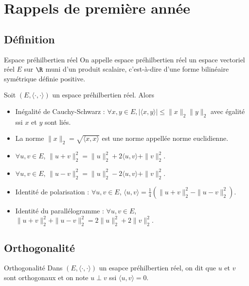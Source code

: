 \section{Rappels de première année}
\subsection{Définition}

\begin{definition}{Espace préhilbertien réel}{}
    On appelle espace préhilbertien réel un espace vectoriel réel $E$
    sur $\R$ muni d'un produit scalaire, c'est-à-dire d'une forme 
    bilinéaire symétrique définie positive.
\end{definition}

\begin{proposition}{}{}
    Soit $(E, \langle \cdot, \cdot \rangle)$ un espace préhilbertien réel. Alors
    \begin{itemize}
        \item Inégalité de Cauchy-Schwarz : $\forall x, y \in E, |\langle x, y \rangle| \leqslant \|x\|_2 \|y\|_2$ avec 
        égalité ssi $x$ et $y$ sont liés.
        \item La norme $\|x\|_2 = \sqrt{\langle x, x \rangle}$ est une norme appellée norme euclidienne.
        \item $\forall u, v \in E$, $\|u + v\|_2^2 = \|u\|_2^2 + 2\langle u, v \rangle + \|v\|_2^2$.
        \item $\forall u, v \in E$, $\|u - v\|_2^2 = \|u\|_2^2 - 2\langle u, v \rangle + \|v\|_2^2$.
        \item Identité de polarisation : $\forall u, v \in E$, $\langle u, v \rangle = \frac{1}{4}(\|u + v\|_2^2 - \|u - v\|_2^2)$.
        \item Identité du parallélogramme : $\forall u, v \in E$, $\|u + v\|_2^2 + \|u - v\|_2^2 = 2\|u\|_2^2 + 2\|v\|_2^2$.
    \end{itemize}
\end{proposition}

\subsection{Orthogonalité}

\begin{definition}{Orthogonalité}{}
    Dans $(E, \langle \cdot, \cdot \rangle)$ un esapce préhilbertien réel, on dit que 
    $u$ et $v$ sont orthogonaux et on note $u \perp v$ ssi $\langle u, v \rangle = 0$.
\end{definition}

